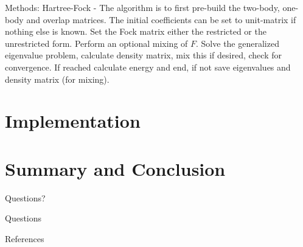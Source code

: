 \documentclass[10pt]{beamer}
\begin{document}
\begin{frame}[fragile]{Methods: Hartree-Fock}
    - The algorithm is to first pre-build the two-body, one-body and overlap
    matrices. The initial coefficients can be set to unit-matrix if nothing
    else is known. Set the Fock matrix either the restricted or the
    unrestricted form. Perform an optional mixing of $F$. Solve the generalized
    eigenvalue problem, calculate density matrix, mix this if desired, check
    for convergence. If reached calculate energy and end, if not save
    eigenvalues and density matrix (for mixing).
\end{frame}

\section{Implementation}
\section{Summary and Conclusion}

{
\begin{frame}[standout]
  Questions?
\end{frame}
}

\appendix

\begin{frame}[fragile]{Questions}
\end{frame}

\begin{frame}[allowframebreaks]{References}

  
  

\end{frame}
\end{document}
